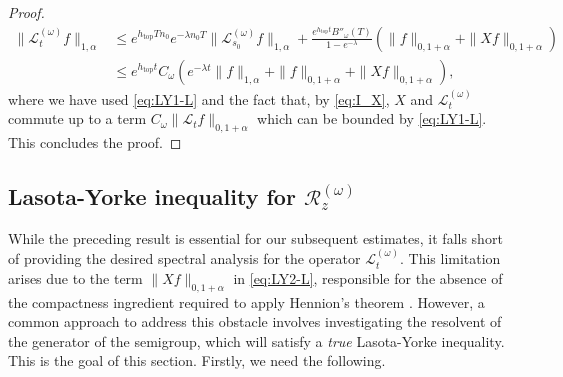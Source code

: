 \documentclass[11pt,letterpaper]{amsart}
\newcommand \cL {{\mathcal L}}
\newcommand \cR {{\mathcal R}}
\DeclareMathOperator{\topp}{top}
\theoremstyle{definition}
\begin{document}
\begin{proof}
\[
\begin{split}
\|\cL^{(\omega)}_t f\|_{1,\alpha} &\le e^{h_{\topp}Tn_0}e^{-\lambda n_0 T}\|\cL_{s_0}^{(\omega)}f\|_{1,\alpha} +\frac{ e^{h_{\topp}t} B''_\omega(T)}{1-e^{-\lambda}}(\|f\|_{0,1+\alpha}+\|Xf\|_{0,1+\alpha})\\
% 
&\le e^{h_{\topp}t}C_\omega ( e^{-\lambda t} \|f\|_{1,\alpha} +\|f\|_{0,1+\alpha}+\|Xf\|_{0,1+\alpha}),
\end{split}
\]
where we have used \eqref{eq:LY1-L} and the fact that, by \eqref{eq:I_X}, $X$ and $\cL^{(\omega)}_t$ commute up to a term $C_\omega\|\cL_t f\|_{0,1+\alpha}$ which can be bounded by \eqref{eq:LY1-L}. This concludes the proof. 
\end{proof}



\subsection{Lasota-Yorke inequality for $\cR_z^{(\omega)}$} While the preceding result is essential for our subsequent estimates, it falls short of providing the desired spectral analysis for the operator $\cL^{(\omega)}_t$. This limitation arises due to the term $\|Xf\|_{0,1+\alpha}$ in \eqref{eq:LY2-L}, responsible for the absence of the compactness ingredient required to apply Hennion's theorem \cite{Hen}. However, a common approach to address this obstacle involves investigating the resolvent of the generator of the semigroup, which will satisfy a {\textit{true}} Lasota-Yorke inequality. This is the goal of this section.
Firstly, we need the following.
\end{document}
